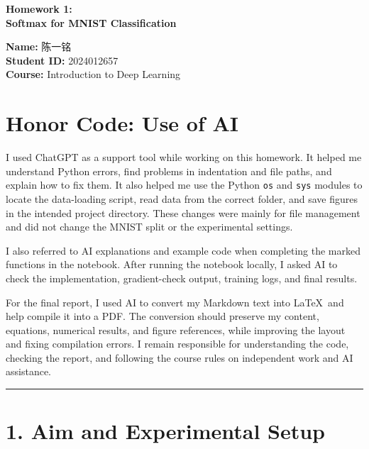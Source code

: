 \documentclass[UTF8,a4paper,12pt,fontset=fandol]{ctexart}
\begin{document}
\begin{center}
{\fontsize{19}{23}\selectfont\bfseries Homework 1:\\[0.25em]
Softmax for MNIST Classification\par}
\end{center}
\vspace{-0.25em}

\noindent \textbf{Name:} 陈一铭\\
\textbf{Student ID:} 2024012657\\
\textbf{Course:} Introduction to Deep Learning

\section*{Honor Code: Use of AI}

I used ChatGPT as a support tool while working on this homework. It helped me understand Python errors, find problems in indentation and file paths, and explain how to fix them. It also helped me use the Python \texttt{os} and \texttt{sys} modules to locate the data-loading script, read data from the correct folder, and save figures in the intended project directory. These changes were mainly for file management and did not change the MNIST split or the experimental settings.

I also referred to AI explanations and example code when completing the marked functions in the notebook. After running the notebook locally, I asked AI to check the implementation, gradient-check output, training logs, and final results.

For the final report, I used AI to convert my Markdown text into \LaTeX \ and help compile it into a PDF. The conversion should preserve my content, equations, numerical results, and figure references, while improving the layout and fixing compilation errors. I remain responsible for understanding the code, checking the report, and following the course rules on independent work and AI assistance.

\par\vspace{0.4em}\noindent\rule{\linewidth}{0.4pt}\par\vspace{0.35em}

\section*{1. Aim and Experimental Setup}
\end{document}

